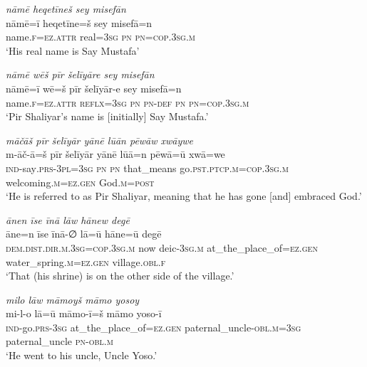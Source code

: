 \ea \label{ŽP.1}
\textit{nāmē heqetīneš sey misefān} \\ 
\gll nāmē=ī heqetīne=š sey misefā=n \\ 
 name\textsc{.f}\textsc{=ez}.\textsc{attr} real\textsc{=3sg} \textsc{pn} \textsc{pn}\textsc{=cop}\textsc{.3sg}\textsc{.m} \\ 
\glt `His real name is Say Mustafa'
\z 
 
\ea \label{ŽP.2}
\textit{nāmē wēš pīr šelīyāre sey misefān} \\ 
\gll nāmē=ī wē=š pīr šelīyār-e sey misefā=n \\ 
 name\textsc{.f}\textsc{=ez}.\textsc{attr} \textsc{reflx}\textsc{=3sg} \textsc{pn} \textsc{pn}\textsc{-def} \textsc{pn} \textsc{pn}\textsc{=cop}\textsc{.3sg}\textsc{.m} \\ 
\glt `Pir Shaliyar’s name is [initially] Say Mustafa.'
\z 
 
\ea \label{ŽP.3}
\textit{māčāš pīr šelīyār yānē lūān pēwāw xwāywe} \\ 
\gll m-āč-ā=š pīr šelīyār yānē lūā=n pēwā=ū xwā=we \\ 
 \textsc{ind-}say\textsc{.prs}\textsc{-3pl}\textsc{=3sg} \textsc{pn} \textsc{pn} that\_means go\textsc{.pst}\textsc{.ptcp}\textsc{.m}\textsc{=cop}\textsc{.3sg}\textsc{.m} welcoming\textsc{.m}\textsc{\textsc{=ez.gen}} God\textsc{.m}\textsc{=\textsc{post}} \\ 
\glt `He is referred to as Pir Shaliyar, meaning that he has gone [and] embraced God.'
\z 
 
\ea \label{ŽP.6}
\textit{ānen īse īnā lāw hānew degē} \\ 
\gll āne=n īse īnā-∅ lā=ū hāne=ū degē \\ 
 \textsc{dem.dist}\textsc{.dir}\textsc{.m}\textsc{.3sg}\textsc{=cop}\textsc{.3sg}\textsc{.m} now deic\textsc{-3sg}\textsc{.m} at\_the\_place\_of\textsc{\textsc{=ez.gen}} water\_spring\textsc{.m}\textsc{\textsc{=ez.gen}} village\textsc{.obl}\textsc{.f} \\ 
\glt `That (his shrine) is on the other side of the village.'
\z 
 
\ea \label{ŽP.11}
\textit{milo lāw māmoyš māmo yosoy} \\ 
\gll mi-l-o lā=ū māmo-ī=š māmo yoso-ī \\ 
 \textsc{ind-}go\textsc{.prs}\textsc{-3sg} at\_the\_place\_of\textsc{\textsc{=ez.gen}} paternal\_uncle\textsc{-obl}\textsc{.m}\textsc{=3sg} paternal\_uncle \textsc{pn}\textsc{-obl}\textsc{.m} \\ 
\glt `He went to his uncle, Uncle Yoso.'
\z 
 

